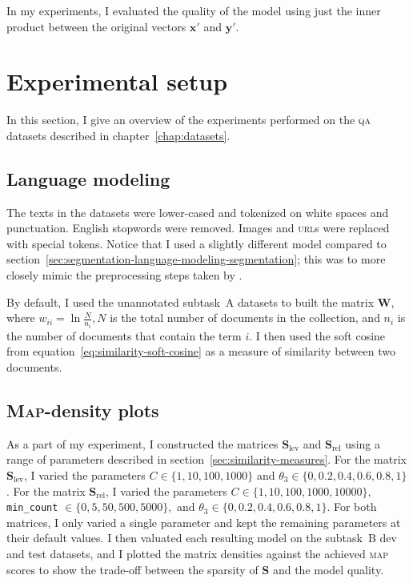 \documentclass[
  digital, %
  notable, %
  lof,     %
  lot,     %
  nopalatino, color
]{fithesis3}
\def\abbr#1{\textsc{\MakeLowercase{#1}}}
\begin{document}
In my experiments, I evaluated the quality of the model using just the inner
product between the original vectors $\mathbf x'$ and $\mathbf y'$.

\section{Experimental setup}
\label{sec:similarity-experimental-setup}
In this section, I give an overview of the experiments performed on the
\abbr{QA}\index{qa@\abbr{QA}} datasets described in chapter~\ref{chap:datasets}.

\subsection{Language modeling}
The texts in the datasets were lower-cased and tokenized on white spaces and
punctuation. English stopwords were removed. Images and \abbr{URL}s were
replaced with special tokens. Notice that I used a slightly different
model compared to section~\ref{sec:segmentation-language-modeling-segmentation};
this was to more closely mimic the preprocessing steps taken by
\textcite{charletdamnati17}.

By default, I used the unannotated subtask~A datasets to built the matrix
$\mathbf W$, where $w_{ii}=\ln\frac N
{n_i},N$ is the total number of
documents in the collection, and $n_i$ is the number of documents that contain
the term $i$.  I then used the soft cosine from
equation~\ref{eq:similarity-soft-cosine} as a measure of similarity between two
documents.

\subsection{\textsc{Map}-density plots}\index{map@\abbr {MAP}}
As a part of my experiment, I constructed the matrices $\mathbf
S_{\textrm{lev}}$ and $\mathbf
S_{\textrm{rel}}$ using a range of
parameters described in section~\ref{sec:similarity-measures}. For the matrix
$\mathbf S_{\textrm{lev}}$, I varied the parameters
$C\in\{1,10,100,1000\}$ and
$\theta_3\in\{0,0.2,0.4,0.6,0.8,1\}$. For the matrix
$\mathbf S_{\textrm{rel}}$, I varied the parameters
$C\in\{1,10,100,1000,10000\},$ \texttt{min\_count}%
${}\in\{0,5,50,500,5000\},$ and
$\theta_3\in\{0,0.2,0.4,0.6,0.8,1\}$.  For both matrices,
I only varied a single parameter and kept the remaining parameters at their
default values. I then valuated each resulting model on the subtask~B dev and
test datasets, and I plotted the matrix densities against the achieved
\abbr{MAP}\index{map@\abbr {MAP}} scores to show the trade-off between the
sparsity of $\mathbf S$ and the model quality.
\end{document}
